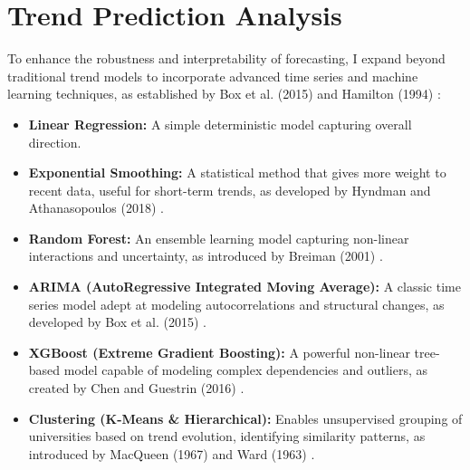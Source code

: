 \documentclass[journal,onecolumn, 10pt,draftclsnofoot]{IEEEtran}
\begin{document}
\section{Trend Prediction Analysis}

To enhance the robustness and interpretability of forecasting, I expand beyond traditional trend models to incorporate advanced time series and machine learning techniques, as established by Box et al. (2015) \cite{box2015time} and Hamilton (1994) \cite{hamilton1994time}:

\begin{itemize}
    \item \textbf{Linear Regression:} A simple deterministic model capturing overall direction.
    \item \textbf{Exponential Smoothing:} A statistical method that gives more weight to recent data, useful for short-term trends, as developed by Hyndman and Athanasopoulos (2018) \cite{hyndman2018forecasting}.
    \item \textbf{Random Forest:} An ensemble learning model capturing non-linear interactions and uncertainty, as introduced by Breiman (2001) \cite{breiman2001random}.
    \item \textbf{ARIMA (AutoRegressive Integrated Moving Average):} A classic time series model adept at modeling autocorrelations and structural changes, as developed by Box et al. (2015) \cite{box2015time}.
    \item \textbf{XGBoost (Extreme Gradient Boosting):} A powerful non-linear tree-based model capable of modeling complex dependencies and outliers, as created by Chen and Guestrin (2016) \cite{chen2016xgboost}.
    \item \textbf{Clustering (K-Means \& Hierarchical):} Enables unsupervised grouping of universities based on trend evolution, identifying similarity patterns, as introduced by MacQueen (1967) \cite{macqueen1967methods} and Ward (1963) \cite{ward1963hierarchical}.
\end{itemize}
\end{document}
